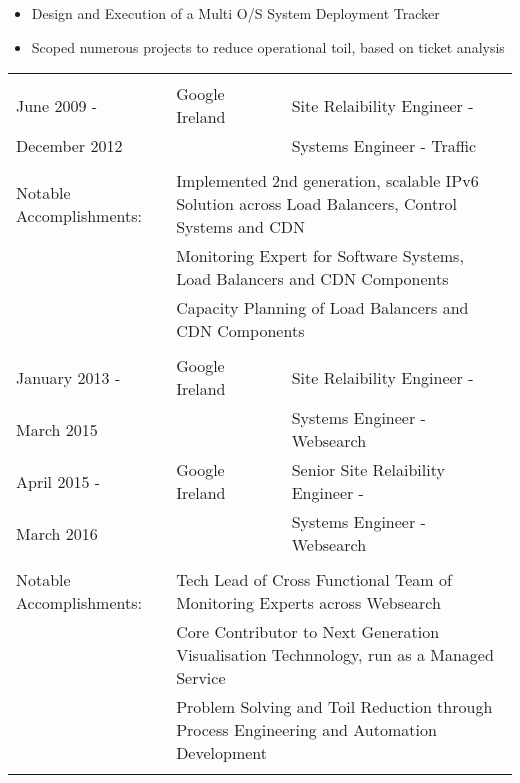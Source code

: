 \documentclass[a4paper, 11pt] {article}
\begin{document}
\begin{itemize}
  \item Design and Execution of a Multi O/S System Deployment Tracker
  \item Scoped numerous projects to reduce operational toil, based on ticket analysis
\end{itemize}

\begin{tabular}{llll}
		& 				&					&			\\
June 2009 - 	&	Google Ireland		&  Site Relaibility Engineer -		&	\hspace{10mm}	\\
December 2012 	&				&  Systems Engineer - Traffic       	&            		\\
      		&				&              				&            		\\
Notable Accomplishments: & \multicolumn{3}{l}{Implemented 2nd generation, scalable IPv6 Solution across Load Balancers, Control Systems and CDN} \\
			 & \multicolumn{3}{l}{Monitoring Expert for Software Systems, Load Balancers and CDN Components}	\\ 
			 & \multicolumn{3}{l}{Capacity Planning of Load Balancers and CDN Components}	\\ 
		& 				&					&			\\
January 2013 -	&	Google Ireland		&  Site Relaibility Engineer -		&	\hspace{10mm}	\\
March 2015 	&				&  Systems Engineer - Websearch       	&            		\\
April 2015 -	&	Google Ireland		&  Senior Site Relaibility Engineer -	&	\hspace{10mm}	\\
March 2016 	&				&  Systems Engineer - Websearch       	&            		\\
      		&				&              				&            		\\
Notable Accomplishments: & \multicolumn{3}{l}{Tech Lead of Cross Functional Team of Monitoring Experts across Websearch} \\
			 & \multicolumn{3}{l}{Core Contributor to Next Generation Visualisation Technnology, run as a Managed Service} \\
			 & \multicolumn{3}{l}{Problem Solving and Toil Reduction through Process Engineering and Automation Development} \\
		& 				&					 	  &			\\

\end{tabular}
\end{document}

